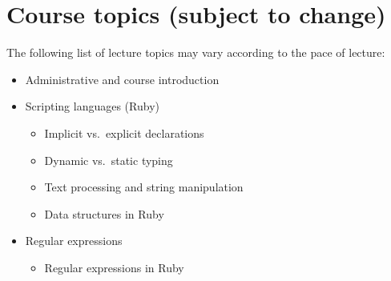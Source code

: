 \documentclass[10pt]{article}
\begin{document}
  \section{Course topics {\sc (subject to change)}}

   The following list of lecture topics may vary according to the pace of
  lecture:

    \vspace{-2mm}

    \begin{multicols}{2}

      \begin{itemize}

        \addtolength{\itemsep}{0mm}

        \item Administrative and course introduction

        \item Scripting languages (Ruby)

              \vspace{-2.5mm}

              \begin{itemize}

                \addtolength{\itemsep}{-.5mm}

                \item Implicit vs.\ explicit declarations

                \item Dynamic vs.\ static typing

                \item Text processing and string manipulation

                \item Data structures in Ruby

              \end{itemize}

              \vspace{-2mm}

        \item Regular expressions

              \vspace{-2.5mm}

              \begin{itemize}

                \addtolength{\itemsep}{-.5mm}

                \item Regular expressions in Ruby


\end{itemize}
\end{itemize}
\end{multicols}
\end{document}
